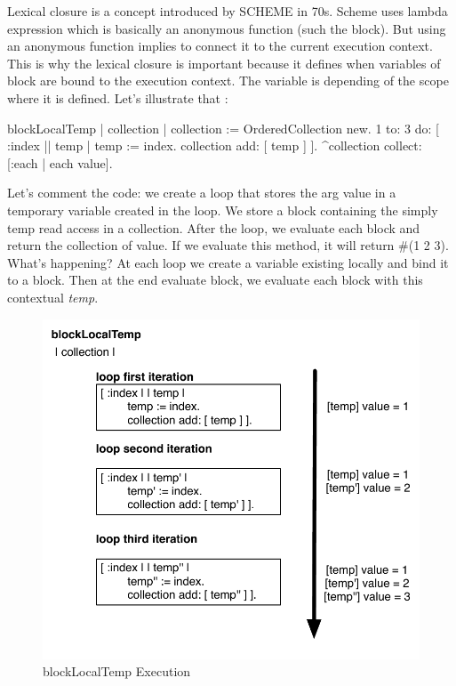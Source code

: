 \documentclass[a4paper,10pt,twoside]{book}
\begin{document}
Lexical closure is a concept introduced by SCHEME in 70s. Scheme uses lambda expression which is basically an anonymous function (such the block). But using an anonymous function implies to connect it to the current execution context. This is why the lexical closure is important because it defines when variables of block are bound to the execution context. The variable is depending of the scope where it is defined. Let's illustrate that :

\begin{code}{}
blockLocalTemp
	| collection |
		collection := OrderedCollection new.
		1 to: 3 do: [ :index || temp |
			temp := index.
			collection add: [ temp ] ].
		^collection collect: [:each | each value].
\end{code}

Let's comment the code: we create a loop that stores the arg value in a temporary variable created in the loop. We store a block containing the simply temp read access in a collection. After the loop, we evaluate each block and return the collection of value.
If we evaluate this method, it will return \#(1 2 3). What's happening? At each loop we create a variable existing locally and bind it to a block. Then at the end evaluate block, we evaluate each block with this contextual \emph{temp}.

\begin{figure}[htbp]
	\centering
        \includegraphics[width=0.7\linewidth]{blockClosureLocalTemp}
	\caption{blockLocalTemp Execution}
	\label{fig:blockLocalTempExecution}
\end{figure}
\end{document}
